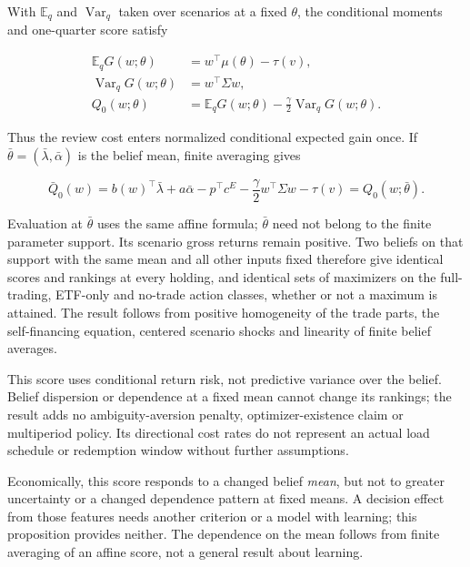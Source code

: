 \documentclass[11pt]{article}
\begin{document}
With \(\mathbb E_q\) and \(\operatorname{Var}_q\) taken over scenarios at a fixed
\(\theta\), the conditional moments and one-quarter score satisfy

\begin{equation*}
\begin{aligned}
\mathbb E_q G(w;\theta)&=w^\top\mu(\theta)-\tau(v),\\
\operatorname{Var}_q G(w;\theta)&=w^\top\Sigma w,\\
Q_0(w;\theta)&=\mathbb E_q G(w;\theta)
              -\frac{\gamma}{2}\operatorname{Var}_q G(w;\theta). 
\end{aligned} \tag{5}\label{eq:5}
\end{equation*}

Thus the review cost enters normalized conditional expected gain once. If
\(\bar\theta=(\bar\lambda,\bar\alpha)\) is the belief mean, finite averaging gives

\begin{equation*}
\bar Q_0(w)=b(w)^\top\bar\lambda+a\bar\alpha-p^\top c^E
 -\frac{\gamma}{2}w^\top\Sigma w-\tau(v)
 =Q_0(w;\bar\theta). \tag{6}\label{eq:6}
\end{equation*}

Evaluation at \(\bar\theta\) uses the same affine formula; \(\bar\theta\) need not
belong to the finite parameter support. Its scenario gross returns remain positive.
Two beliefs on that support with the same mean and all other inputs fixed therefore
give identical scores and rankings at every holding, and identical sets of maximizers
on the full-trading, ETF-only and no-trade action classes, whether or not a maximum is
attained. The result follows from positive homogeneity of the trade parts, the
self-financing equation, centered scenario shocks and linearity of finite belief
averages.

This score uses conditional return risk, not predictive variance over the belief.
Belief dispersion or dependence at a fixed mean cannot change its rankings; the result
adds no ambiguity-aversion penalty, optimizer-existence claim or multiperiod policy.
Its directional cost rates do not represent an actual load schedule or redemption
window without further assumptions.

Economically, this score responds to a changed belief \emph{mean}, but not
to greater uncertainty or a changed dependence pattern at fixed
means. A decision effect from those features needs another
criterion or a model with learning; this proposition provides
neither. The dependence on the mean follows from finite averaging of
an affine score, not a general result about learning.
\end{document}
